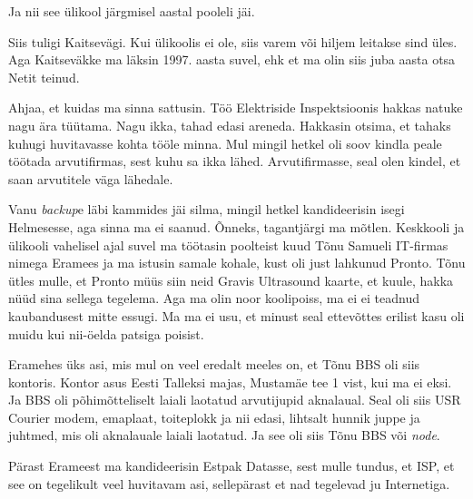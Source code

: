 Ja nii see ülikool järgmisel aastal pooleli jäi.


Siis tuligi Kaitsevägi. Kui ülikoolis ei ole, siis varem või 
hiljem leitakse sind üles. Aga  Kaitseväkke ma läksin 1997. aasta suvel, ehk et 
ma olin siis juba aasta otsa Netit teinud. 

Ahjaa, et kuidas ma sinna sattusin. Töö Elektriside Inspektsioonis  hakkas natuke nagu ära tüütama. Nagu ikka,  tahad 
edasi areneda. Hakkasin otsima, et tahaks kuhugi  huvitavasse kohta tööle 
minna.  Mul mingil hetkel oli soov kindla peale töötada arvutifirmas, sest kuhu 
sa ikka lähed. Arvutifirmasse, seal olen kindel, et saan arvutitele väga 
lähedale.

Vanu \emph{backup}e läbi kammides jäi silma, mingil hetkel kandideerisin isegi 
Helmesesse, aga sinna ma ei saanud. Õnneks, tagantjärgi ma 
mõtlen. Keskkooli ja ülikooli vahelisel ajal suvel ma töötasin poolteist kuud 
Tõnu Samueli IT-firmas nimega Eramees 
ja ma istusin samale kohale, kust oli just lahkunud Pronto.  
 Tõnu ütles mulle, et Pronto müüs siin  neid Gravis 
Ultrasound kaarte, et kuule, hakka nüüd sina sellega tegelema. Aga ma olin 
noor koolipoiss, ma ei  ei teadnud kaubandusest mitte essugi. Ma ma ei usu, et 
minust seal ettevõttes erilist kasu oli muidu kui nii-öelda patsiga poisist. 


Eramehes üks asi, mis mul on veel eredalt meeles on, et Tõnu BBS oli siis 
kontoris. Kontor asus Eesti Talleksi majas, Mustamäe tee 1 vist, kui ma ei 
eksi. Ja BBS oli põhimõtteliselt  laiali laotatud arvutijupid  aknalaual. Seal 
oli siis USR Courier modem,  emaplaat, toiteplokk  
ja nii edasi, lihtsalt hunnik juppe ja juhtmed, mis oli aknalauale laiali 
laotatud. Ja see oli siis Tõnu BBS või \emph{node}.

Pärast Erameest ma kandideerisin Estpak Datasse, sest mulle 
tundus, et ISP, et see on tegelikult veel huvitavam asi, sellepärast et nad 
tegelevad ju Internetiga.

